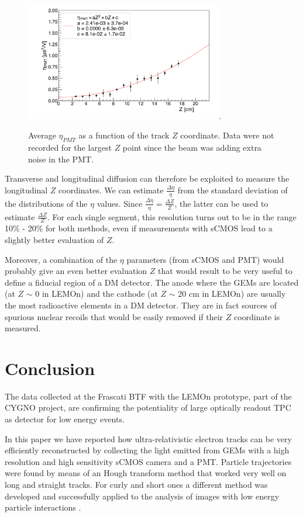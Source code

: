 \documentclass[review]{elsarticle}
\begin{document}
\begin{figure}[ht]
\centering
\includegraphics[width=3.4in]{Fig10-eta-PMT-Z.pdf}\DeclareGraphicsExtensions.
\caption{Average $\eta_{PMT}$ as a function of the track $Z$ coordinate. Data were not recorded for the largest $Z$ point since the beam was adding extra noise in the PMT.}
\label{fig:Tdiffusion}
\end{figure}


Transverse  and longitudinal  diffusion can therefore  be exploited to measure the longitudinal $Z$ coordinates. We can estimate $\frac{\Delta \eta}{\eta}$  from the standard deviation of the distributions of the  $\eta$ values. Since $\frac{\Delta \eta}{\eta} =\frac{\Delta Z}{Z} $, the latter can be used to estimate  $\frac{\Delta Z}{Z}$. For each single segment, this resolution turns out to be  in the range 10\% - 20\% for both methods, even if measurements with sCMOS lead to a slightly better evaluation of $Z$.

Moreover, a combination of the $\eta$ parameters (from sCMOS and PMT) would probably give an even better evaluation $Z$ that would result to be very  useful to define a fiducial region  of a DM detector. The anode where the GEMs are located (at $Z$ $\sim$ 0 in LEMOn) and the cathode (at $Z$ $\sim$ 20 cm in LEMOn) are usually the most radioactive elements in a DM detector. They are in fact sources of spurious nuclear recoils that would be easily  removed if their $Z$ coordinate is measured.

\section{Conclusion}

The data collected at the Frascati BTF with the LEMOn prototype, part of the CYGNO project, are confirming the potentiality of large optically readout TPC as detector for low energy events.

In this paper we have reported how  ultra-relativistic electron tracks can be  very efficiently reconstructed by collecting the light emitted from GEMs with a high resolution and high sensitivity sCMOS camera and a PMT.
Particle trajectories were found by means of an Hough transform method that worked very well on long and straight tracks. For curly and short ones a different method was developed and successfully applied to the analysis of images with low energy particle interactions \cite{bib:clus}.
\end{document}
